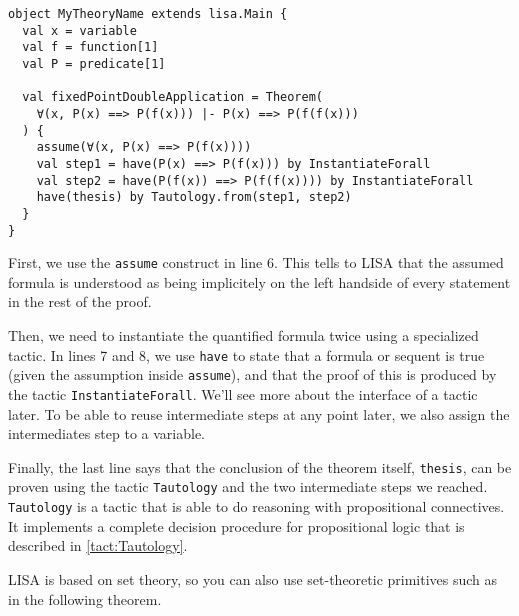 \noindent\begin{minipage}{\linewidth}\vspace{1em}
\begin{lstlisting}[language=lisa, frame=single]
object MyTheoryName extends lisa.Main {
  val x = variable
  val f = function[1]
  val P = predicate[1]

  val fixedPointDoubleApplication = Theorem( 
    ∀(x, P(x) ==> P(f(x))) |- P(x) ==> P(f(f(x)))
  ) {
    assume(∀(x, P(x) ==> P(f(x))))
    val step1 = have(P(x) ==> P(f(x))) by InstantiateForall
    val step2 = have(P(f(x)) ==> P(f(f(x)))) by InstantiateForall
    have(thesis) by Tautology.from(step1, step2)
  } 
}
\end{lstlisting}
\end{minipage}
First, we use the \lstinline|assume| construct in line 6.
This tells to LISA that the assumed formula is understood as being implicitely on the left handside of every statement in the rest of the proof. 

Then, we need to instantiate the quantified formula twice using a specialized tactic. In lines 7 and 8, we use \lstinline|have| to state that a formula or sequent is true (given the assumption inside \lstinline|assume|), and that the proof of this is produced by the tactic \lstinline|InstantiateForall|.
We'll see more about the interface of a tactic later. To be able to reuse intermediate steps at any point later, we also assign the intermediates step to a variable.

Finally, the last line says that the conclusion of the theorem itself, \lstinline|thesis|, can be proven using the tactic \lstinline|Tautology| and the two intermediate steps we reached. \lstinline|Tautology| is a tactic that is able to do reasoning with propositional connectives. It implements a complete decision procedure for propositional logic that is described in \autoref{tact:Tautology}.

LISA is based on set theory, so you can also use set-theoretic primitives such as in the following theorem.

